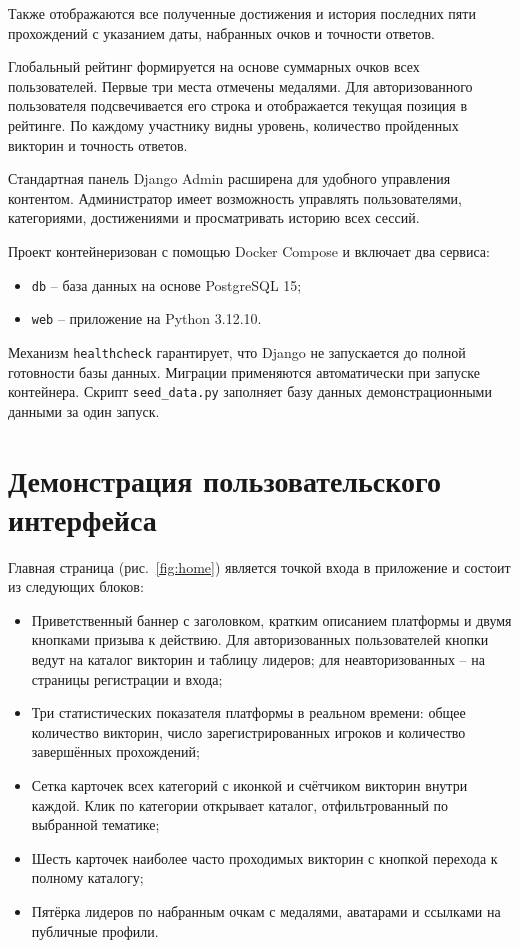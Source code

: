 \documentclass[14pt,a4paper]{extreport}
\begin{document}
Также отображаются все полученные достижения и история последних пяти прохождений с указанием даты, набранных очков и точности ответов.

Глобальный рейтинг формируется на основе суммарных очков всех пользователей. Первые три места отмечены медалями. Для авторизованного пользователя подсвечивается его строка и отображается текущая позиция в рейтинге. По каждому участнику видны уровень, количество пройденных викторин и точность ответов.

Стандартная панель Django Admin расширена для удобного управления контентом. Администратор имеет возможность управлять пользователями, категориями, достижениями и просматривать историю всех сессий.

Проект контейнеризован с помощью Docker Compose и включает два сервиса:
\begin{itemize}
    \item \texttt{db} -- база данных на основе PostgreSQL 15;
    \item \texttt{web} -- приложение на Python 3.12.10.
\end{itemize}

Механизм \texttt{healthcheck} гарантирует, что Django не запускается до полной готовности базы данных. Миграции применяются автоматически при запуске контейнера. Скрипт \texttt{seed\_data.py} заполняет базу данных демонстрационными данными за один запуск.

\section{Демонстрация пользовательского интерфейса}

Главная страница (рис.~\ref{fig:home}) является точкой входа в приложение и состоит из следующих блоков:

\begin{itemize}
    \item Приветственный баннер с заголовком, кратким описанием платформы и двумя кнопками призыва к действию. Для авторизованных пользователей кнопки ведут на каталог викторин и таблицу лидеров; для неавторизованных -- на страницы регистрации и входа;
    \item Три статистических показателя платформы в реальном времени: общее количество викторин, число зарегистрированных игроков и количество завершённых прохождений;
    \item Сетка карточек всех категорий с иконкой и счётчиком викторин внутри каждой. Клик по категории открывает каталог, отфильтрованный по выбранной тематике;
    \item Шесть карточек наиболее часто проходимых викторин с кнопкой перехода к полному каталогу;
    \item Пятёрка лидеров по набранным очкам с медалями, аватарами и ссылками на публичные профили.
\end{itemize}
\end{document}
